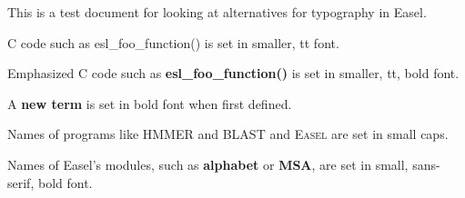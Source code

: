 \documentclass[10pt]{book}
\begin{document}
This is a test document for looking at alternatives for typography in
Easel.

C code such as {\smaller\ttfamily esl\_foo\_function()} is set in
smaller, tt font.

Emphasized C code such as {\smaller\ttfamily\bfseries
esl\_foo\_function()} is set in smaller, tt, bold font.

A {\bfseries new term} is set in bold font when first defined.

Names of programs like {\scshape HMMER} and {\scshape BLAST} and
{\scshape Easel} are set in small caps.

Names of Easel's modules, such as 
{\smaller\sffamily\bfseries alphabet} or 
{\smaller\sffamily\bfseries MSA},
are set in small, sans-serif, bold font. 
\end{document}

